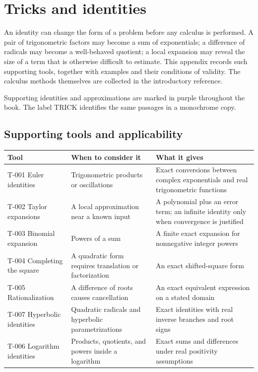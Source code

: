 \documentclass[11pt,oneside,openany]{book}
\begin{document}
\appendix
\chapter{Tricks and identities}
\markright{}
\begingroup\color{TrickPurple}

An identity can change the form of a problem before any calculus is performed.
A pair of trigonometric factors may become a sum of exponentials; a difference
of radicals may become a well-behaved quotient; a local expansion may reveal the
size of a term that is otherwise difficult to estimate. This appendix records
such supporting tools, together with examples and their conditions of validity.
The calculus methods themselves are collected in the introductory reference.

Supporting identities and approximations are marked in purple throughout the
book. The label TRICK identifies the same passages in a monochrome copy.

\section{Supporting tools and applicability}

\begingroup\small\setlength{\tabcolsep}{5pt}\renewcommand{\arraystretch}{1.15}
\begin{longtable}{@{}>{\raggedright\arraybackslash}p{}>{\raggedright\arraybackslash}p{}>{\raggedright\arraybackslash}p{}@{}}
\textbf{Tool} & \textbf{When to consider it} & \textbf{What it gives} \\[5pt]
\hline\endhead
T-001 Euler identities & Trigonometric products or oscillations & Exact conversions between complex exponentials and real trigonometric functions \\[5pt]
T-002 Taylor expansions & A local approximation near a known input & A polynomial plus an error term; an infinite identity only when convergence is justified \\[5pt]
T-003 Binomial expansion & Powers of a sum & A finite exact expansion for nonnegative integer powers \\[5pt]
T-004 Completing the square & A quadratic form requires translation or factorization & An exact shifted-square form \\[5pt]
T-005 Rationalization & A difference of roots causes cancellation & An exact equivalent expression on a stated domain \\[5pt]
T-007 Hyperbolic identities & Quadratic radicals and hyperbolic parametrizations & Exact identities with real inverse branches and root signs \\[5pt]
T-006 Logarithm identities & Products, quotients, and powers inside a logarithm & Exact sums and differences under real positivity assumptions \\[5pt]
\end{longtable}\endgroup
\end{document}
